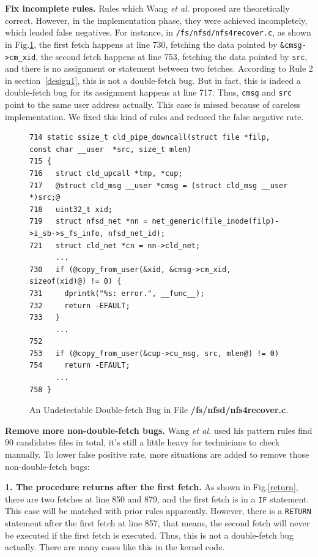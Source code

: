 \documentclass[10pt]{llncs}
\begin{document}
\textbf{Fix incomplete rules.}
Rules which Wang \textit{et al.} proposed are theoretically correct. However, in the implementation phase, they were achieved incompletely, which leaded false negatives. For instance, in \verb:/fs/nfsd/nfs4recover.c:, as shown in Fig.\ref{fix}, the first fetch happens at line 730, fetching the data pointed by \verb:&cmsg->cm_xid:, the second fetch happens at line 753, fetching the data pointed by \verb:src:, and there is no assignment or statement between two fetches. According to Rule 2 in section~\ref{design1}, this is not a double-fetch bug. But in fact, this is indeed a double-fetch bug for its assignment happens at line 717. Thus, \verb:cmsg: and \verb:src: point to the same user address actually. This case is missed because of careless implementation. We fixed this kind of rules and reduced the false negative rate.

\begin{figure}[t]
  \centering
\begin{lstlisting}[style=code]
714 static ssize_t cld_pipe_downcall(struct file *filp, const char __user  *src, size_t mlen)
715 {
716   struct cld_upcall *tmp, *cup;
717   @struct cld_msg __user *cmsg = (struct cld_msg __user *)src;@
718   uint32_t xid;
719   struct nfsd_net *nn = net_generic(file_inode(filp)->i_sb->s_fs_info, nfsd_net_id);
721   struct cld_net *cn = nn->cld_net;
	  ...
730   if (@copy_from_user(&xid, &cmsg->cm_xid, sizeof(xid)@) != 0) {
731     dprintk("%s: error.", __func__);
732     return -EFAULT;
733   }
	  ...
752 
753   if (@copy_from_user(&cup->cu_msg, src, mlen@) != 0)
754     return -EFAULT;
	  ...
758 }
\end{lstlisting}
  \caption{An Undetectable Double-fetch Bug in File \textbf{/fs/nfsd/nfs4recover.c}.}
  \label{fix}
\end{figure}


\textbf{Remove more non-double-fetch bugs.}
Wang \textit{et al.} used his pattern rules find 90 candidates files in total, it's still a little heavy for technicians to check manually. To lower false positive rate, more situations are added to remove those non-double-fetch bugs:

\textbf{1. The procedure returns after the first fetch.}
As shown in Fig.\ref{return}, there are two fetches at line 850 and 879, and the first fetch is in a \verb:IF: statement. This case will be matched with prior rules apparently. However, there is a \verb:RETURN: statement after the first fetch at line 857, that means, the second fetch will never be executed if the first fetch is executed. Thus, this is not a double-fetch bug actually. There are many cases like this in the kernel code.
\end{document}
